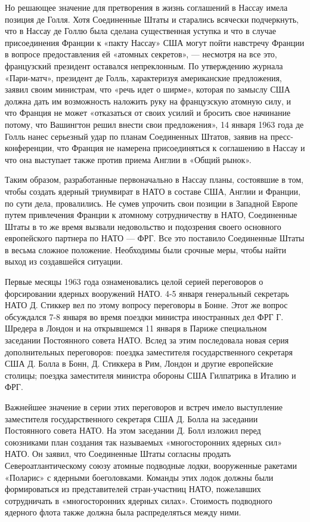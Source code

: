 \documentclass[12pt, a4paper, openany]{book}
\begin{document}
Но решающее значение для претворения в жизнь соглашений в Нассау имела позиция де Голля. Хотя Соединенные Штаты и старались всячески подчеркнуть, что в Нассау де Голлю была сделана существенная уступка и что в случае присоединения Франции к «пакту Нассау» США могут пойти навстречу Франции в вопросе предоставления ей «атомных секретов», — несмотря на все это, французский президент оставался непреклонным. По утверждению журнала «Пари-матч», президент де Голль, характеризуя американские предложения, заявил своим министрам, что «речь идет о ширме», которая по замыслу США должна дать им возможность наложить руку на французскую атомную силу, и что Франция не может «отказаться от своих усилий и бросить свое начинание потому, что Вашингтон решил внести свои предложения», 14 января 1963 года де Голль нанес серьезный удар по планам Соединенных Штатов, заявив на пресс-конференции, что Франция не намерена присоединяться к соглашению в Нассау и что она выступает также против приема Англии в «Общий рынок».

Таким образом, разработанные первоначально в Нассау планы, состоявшие в том, чтобы создать ядерный триумвират в НАТО в составе США, Англии и Франции, по сути дела, провалились. Не сумев упрочить свои позиции в Западной Европе путем привлечения Франции к атомному сотрудничеству в НАТО, Соединенные Штаты в то же время вызвали недовольство и подозрения своего основного европейского партнера по НАТО — ФРГ. Все это поставило Соединенные Штаты в весьма сложное положение. Необходимы были срочные меры, чтобы найти выход из создавшейся ситуации.

Первые месяцы 1963 года ознаменовались целой серией переговоров о форсировании ядерных вооружений НАТО. 4-5 января генеральный секретарь НАТО Д. Стиккер вел по этому вопросу переговоры в Бонне. Этот же вопрос обсуждался 7-8 января во время поездки министра иностранных дел ФРГ Г. Шредера в Лондон и на открывшемся 11 января в Париже специальном заседании Постоянного совета НАТО. Вслед за этим последовала новая серия дополнительных переговоров: поездка заместителя государственного секретаря США Д. Болла в Бонн, Д. Стиккера в Рим, Лондон и другие европейские столицы; поездка заместителя министра обороны США Гилпатрика в Италию и ФРГ.

Важнейшее значение в серии этих переговоров и встреч имело выступление заместителя государственного секретаря США Д. Болла на заседании Постоянного совета НАТО. На этом заседании Д. Болл изложил перед союзниками план создания так называемых «многосторонних ядерных сил» НАТО. Он заявил, что Соединенные Штаты согласны продать Североатлантическому союзу атомные подводные лодки, вооруженные ракетами «Поларис» с ядерными боеголовками. Команды этих лодок должны были формироваться из представителей стран-участниц НАТО, пожелавших сотрудничать в «многосторонних ядерных силах». Стоимость подводного ядерного флота также должна была распределяться между ними.
\end{document}
